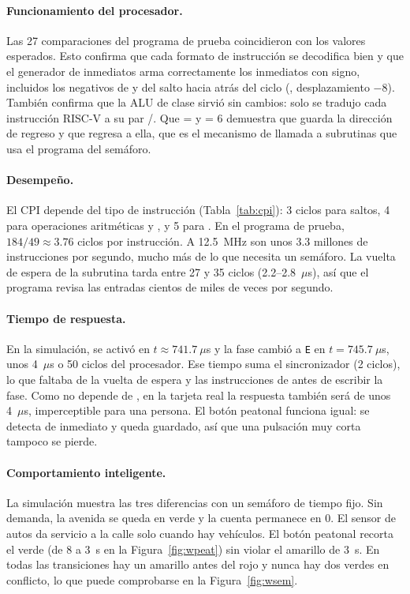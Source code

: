 \documentclass[12pt,letterpaper]{article}
\begin{document}
\paragraph{Funcionamiento del procesador.}
Las 27 comparaciones del programa de prueba coincidieron con los valores esperados. Esto
confirma que cada formato de instrucción se decodifica bien y que el generador de inmediatos arma
correctamente los inmediatos con signo, incluidos los negativos de  y del
salto hacia atrás del ciclo (, desplazamiento $-8$). También confirma que la ALU de
clase sirvió sin cambios: solo se tradujo cada instrucción RISC-V a su par
/. Que  =  y  = 6 demuestra que 
guarda la dirección de regreso y que  regresa a ella, que es el mecanismo de llamada a
subrutinas que usa el programa del semáforo.

\paragraph{Desempeño.}
El CPI depende del tipo de instrucción (Tabla~\ref{tab:cpi}): 3 ciclos para saltos, 4 para
operaciones aritméticas y , y 5 para . En el programa de prueba,
$184 / 49 \approx 3.76$ ciclos por instrucción. A 12.5~MHz son unos 3.3 millones de
instrucciones por segundo, mucho más de lo que necesita un semáforo. La vuelta de espera de la
subrutina  tarda entre 27 y 35 ciclos (2.2--2.8~$\mu$s), así que el programa revisa
las entradas cientos de miles de veces por segundo.

\paragraph{Tiempo de respuesta.}
En la simulación,  se activó en $t \approx 741.7~\mu$s y la fase cambió a \texttt{E}
en $t = 745.7~\mu$s, unos 4~$\mu$s o 50 ciclos del procesador. Ese tiempo suma el sincronizador
(2 ciclos), lo que faltaba de la vuelta de espera y las instrucciones de  antes
de escribir la fase. Como no depende de , en la tarjeta real la respuesta también
será de unos 4~$\mu$s, imperceptible para una persona. El botón peatonal funciona igual: se
detecta de inmediato y queda guardado, así que una pulsación muy corta tampoco se pierde.

\paragraph{Comportamiento inteligente.}
La simulación muestra las tres diferencias con un semáforo de tiempo fijo. Sin demanda, la
avenida se queda en verde y la cuenta permanece en 0. El sensor de autos da servicio a la calle
solo cuando hay vehículos. El botón peatonal recorta el verde (de 8 a 3~s en la
Figura~\ref{fig:wpeat}) sin violar el amarillo de 3~s. En todas las transiciones hay un amarillo
antes del rojo y nunca hay dos verdes en conflicto, lo que puede comprobarse en la
Figura~\ref{fig:wsem}.
\end{document}
